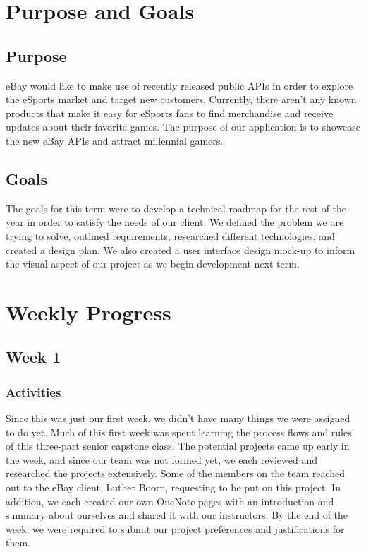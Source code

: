 \documentclass[onecolumn, draftclsnofoot,10pt, compsoc]{IEEEtran}
\begin{document}
\newpage
{}
\tableofcontents
\clearpage


\section{Purpose and Goals}

\subsection{Purpose}
eBay would like to make use of recently released public APIs in order to explore the eSports market and target new customers. 
Currently, there aren’t any known products that make it easy for eSports fans to find merchandise and receive updates about their favorite games. 
The purpose of our application is to showcase the new eBay APIs and attract millennial gamers. 

\subsection{Goals}
The goals for this term were to develop a technical roadmap for the rest of the year in order to satisfy the needs of our client. 
We defined the problem we are trying to solve, outlined requirements, researched different technologies, and created a design plan. 
We also created a user interface design mock-up to inform the visual aspect of our project as we begin development next term. 

\section{Weekly Progress}

\subsection{Week 1}

\subsubsection{Activities}
Since this was just our first week, we didn’t have many things we were assigned to do yet. Much of this first week was spent learning the process flows and rules of this three-part senior capstone class. The potential projects came up early in the week, and since our team was not formed yet, we each reviewed and researched the projects extensively. Some of the members on the team reached out to the eBay client, Luther Boorn, requesting to be put on this project. In addition, we each created our own OneNote pages with an introduction and summary about ourselves and shared it with our instructors. By the end of the week, we were required to submit our project preferences and justifications for them. 
\end{document}
